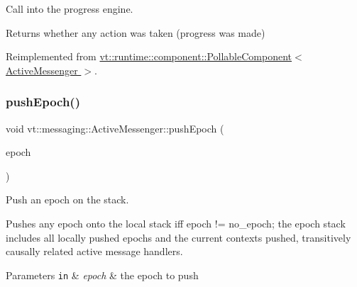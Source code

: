 Call into the progress engine. 

\begin{DoxyReturn}{Returns}
whether any action was taken (progress was made) 
\end{DoxyReturn}


Reimplemented from \hyperlink{structvt_1_1runtime_1_1component_1_1_pollable_component_a34cad810026224d550cd9b0c9d1eff22}{vt\+::runtime\+::component\+::\+Pollable\+Component$<$ Active\+Messenger $>$}.

\mbox{\label{structvt_1_1messaging_1_1_active_messenger_ac60a61b85392a5c40d2334919981963a}} 
\subsubsection{\texorpdfstring{push\+Epoch()}{pushEpoch()}}
{\footnotesize\ttfamily void vt\+::messaging\+::\+Active\+Messenger\+::push\+Epoch (\begin{DoxyParamCaption}\item[{\hyperlink{namespacevt_a985a5adf291c34a3ca263b3378388236}{Epoch\+Type} const \&}]{epoch }\end{DoxyParamCaption})\hspace{0.3cm}{\ttfamily [inline]}}



Push an epoch on the stack. 

Pushes any epoch onto the local stack iff epoch != no\+\_\+epoch; the epoch stack includes all locally pushed epochs and the current contexts pushed, transitively causally related active message handlers.


\begin{DoxyParams}[1]{Parameters}
\mbox{\tt in}  & {\em epoch} & the epoch to push \\
\hline
\end{DoxyParams}
\mbox{\label{structvt_1_1messaging_1_1_active_messenger_a030dfbfd95be050b71eea091d07bd66a}} 
